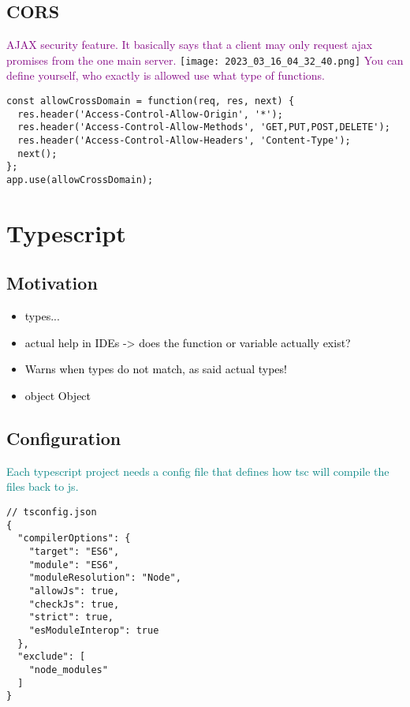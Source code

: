\documentclass[main.tex,fontsize=8pt,paper=a4,paper=portrait,DIV=calc,]{scrartcl}
\begin{document}
\subsection{CORS}
\textcolor{purple}{AJAX security feature. It basically says that a client may only request ajax promises from the one main server.}\newline
\texttt{[image: 2023\_03\_16\_04\_32\_40.png]}\newline
\textcolor{purple}{You can define yourself, who exactly is allowed use what type of functions.}
\begin{lstlisting}
const allowCrossDomain = function(req, res, next) {
  res.header('Access-Control-Allow-Origin', '*');
  res.header('Access-Control-Allow-Methods', 'GET,PUT,POST,DELETE');
  res.header('Access-Control-Allow-Headers', 'Content-Type');
  next();
};
app.use(allowCrossDomain);
\end{lstlisting}

\section{Typescript}

\subsection{Motivation}
\begin{itemize}
\item \textcolor{black}{types...}
\item \textcolor{black}{actual help in IDEs -> does the function or variable actually exist?}
\item \textcolor{black}{Warns when types do not match, as said actual types!}
\item \textcolor{black}{object Object}
\end{itemize} 

\subsection{Configuration}
\textcolor{teal}{Each typescript project needs a config file that defines how tsc will compile the files back to js.}
\begin{lstlisting}
// tsconfig.json
{
  "compilerOptions": {
    "target": "ES6",
    "module": "ES6",
    "moduleResolution": "Node",
    "allowJs": true,
    "checkJs": true,
    "strict": true,
    "esModuleInterop": true
  },
  "exclude": [
    "node_modules"
  ]
}
\end{lstlisting}
\end{document}

